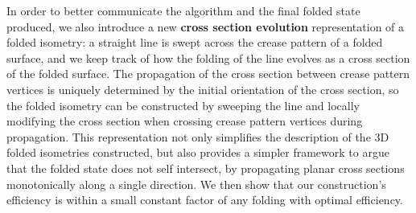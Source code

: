 \documentclass[a4paper,11pt]{article}
\begin{document}
In order to better communicate the algorithm and the final folded state
produced, we also introduce a new {\bf cross section evolution} representation
of a folded isometry: a straight line is swept across the crease pattern of a
folded surface, and we keep track of how the folding of the line evolves as a
cross section of the folded surface. The propagation of the cross section
between crease pattern vertices is uniquely determined by the initial
orientation of the cross section, so the folded isometry can be constructed by
sweeping the line and locally modifying the cross section when crossing crease
pattern vertices during propagation. This representation not only simplifies the
description of the 3D folded isometries constructed, but also provides a simpler
framework to argue that the folded state does not self intersect, by propagating
planar cross sections monotonically along a single direction. We then
show that our construction's efficiency is within a small constant factor of
any folding with optimal efficiency.

\let\realbibitem=\bibitem
\def\smallbibitem{\par \vspace{-1.2ex}\realbibitem}
\def\bibitem{\let\bibitem=\smallbibitem \realbibitem}

{
\small


}
\end{document}
